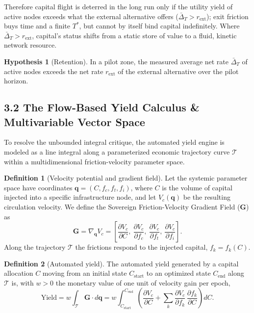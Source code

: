 \documentclass[11pt,a4paper]{article}
\theoremstyle{definition}
\newtheorem{definition}{Definition}
\newtheorem{hypothesis}{Hypothesis}
\theoremstyle{plain}
\theoremstyle{remark}
\begin{document}
Therefore capital flight is deterred in the long run only if the utility yield of active nodes exceeds what the external alternative offers ($\bar\Delta_T > r_{\mathrm{ext}}$); exit friction buys time and a finite $T^{*}$, but cannot by itself bind capital indefinitely. Where $\bar\Delta_T > r_{\mathrm{ext}}$, capital's status shifts from a static store of value to a fluid, kinetic network resource.

\begin{hypothesis}[Retention]\label{hyp:retention}
In a pilot zone, the measured average net rate $\bar\Delta_T$ of active nodes exceeds the net rate $r_{\mathrm{ext}}$ of the external alternative over the pilot horizon.
\end{hypothesis}

\subsection*{3.2 The Flow-Based Yield Calculus \& Multivariable Vector Space}
To resolve the unbounded integral critique, the automated yield engine is modeled as a line integral along a parameterized economic trajectory curve $\mathcal T$ within a multidimensional friction-velocity parameter space.

\begin{definition}[Velocity potential and gradient field]\label{def:G}
Let the systemic parameter space have coordinates $\mathbf q = (C, f_c, f_t, f_i)$, where $C$ is the volume of capital injected into a specific infrastructure node, and let $V_c(\mathbf q)$ be the resulting circulation velocity. We define the Sovereign Friction-Velocity Gradient Field ($\mathbf G$) as
\begin{equation}
\mathbf G = \nabla_{\mathbf q} V_c = \left[ \frac{\partial V_c}{\partial C},\
\frac{\partial V_c}{\partial f_c},\
\frac{\partial V_c}{\partial f_t},\
\frac{\partial V_c}{\partial f_i} \right].
\end{equation}
Along the trajectory $\mathcal T$ the frictions respond to the injected capital, $f_k = f_k(C)$.
\end{definition}

\begin{definition}[Automated yield]\label{def:yield}
The automated yield generated by a capital allocation $C$ moving from an initial state $C_{\mathrm{start}}$ to an optimized state $C_{\mathrm{end}}$ along $\mathcal T$ is, with $w > 0$ the monetary value of one unit of velocity gain per epoch,
\begin{equation}
\mathrm{Yield} = w \int_{\mathcal T} \mathbf G \cdot d\mathbf q
= w \int_{C_{\mathrm{start}}}^{C_{\mathrm{end}}}
\left( \frac{\partial V_c}{\partial C}
+ \sum_k \frac{\partial V_c}{\partial f_k}\, \frac{\partial f_k}{\partial C} \right) dC .
\end{equation}
\end{definition}
\end{document}

